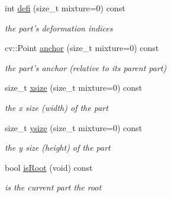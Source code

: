 \begin{DoxyCompactItemize}
int \hyperlink{classComponentPart_ae1d71f86350d8757e33bbeb1af85f4fa}{defi} (size\-\_\-t mixture=0) const 
\begin{DoxyCompactList}\small\item\em the part's deformation indices \end{DoxyCompactList}\item 
cv\-::\-Point \hyperlink{classComponentPart_a7e2cdd67c7a6a7c66826ac9b5c4ce372}{anchor} (size\-\_\-t mixture=0) const 
\begin{DoxyCompactList}\small\item\em the part's anchor (relative to its parent part) \end{DoxyCompactList}\item 
size\-\_\-t \hyperlink{classComponentPart_a2a0785678aa70d37132c13671204bb55}{xsize} (size\-\_\-t mixture=0) const 
\begin{DoxyCompactList}\small\item\em the x size (width) of the part \end{DoxyCompactList}\item 
size\-\_\-t \hyperlink{classComponentPart_a7db69e2def014c1b9c0e7ea9d7315354}{ysize} (size\-\_\-t mixture=0) const 
\begin{DoxyCompactList}\small\item\em the y size (height) of the part \end{DoxyCompactList}\item 
bool \hyperlink{classComponentPart_a5c2cb9582276cb9cfa11cd9ba95aac85}{is\-Root} (void) const 
\begin{DoxyCompactList}\small\item\em is the current part the root \end{DoxyCompactList}\end{DoxyCompactItemize}
